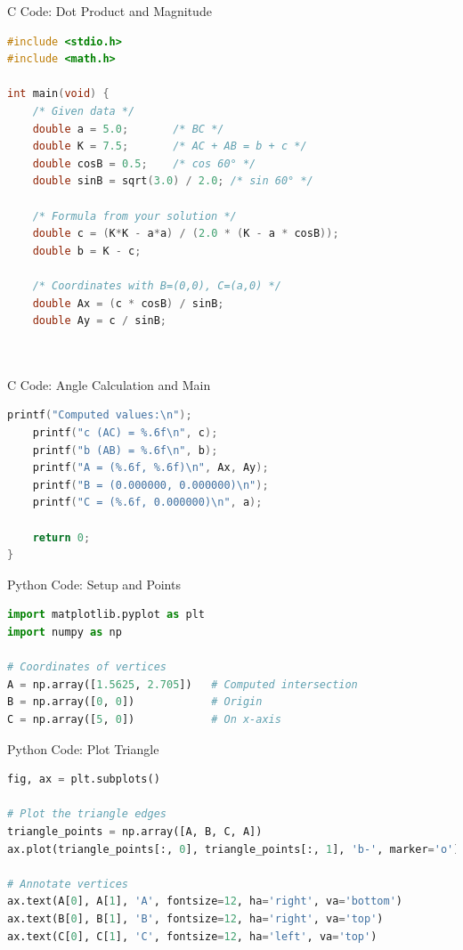 \documentclass{beamer}
\begin{document}
\begin{frame}[fragile]{C Code: Dot Product and Magnitude}
\begin{lstlisting}[language=C]
#include <stdio.h>
#include <math.h>

int main(void) {
    /* Given data */
    double a = 5.0;       /* BC */
    double K = 7.5;       /* AC + AB = b + c */
    double cosB = 0.5;    /* cos 60° */
    double sinB = sqrt(3.0) / 2.0; /* sin 60° */

    /* Formula from your solution */
    double c = (K*K - a*a) / (2.0 * (K - a * cosB));
    double b = K - c;

    /* Coordinates with B=(0,0), C=(a,0) */
    double Ax = (c * cosB) / sinB;
    double Ay = c / sinB;

    

\end{lstlisting}
\end{frame}

\begin{frame}[fragile]{C Code: Angle Calculation and Main}
\begin{lstlisting}[language=C]
printf("Computed values:\n");
    printf("c (AC) = %.6f\n", c);
    printf("b (AB) = %.6f\n", b);
    printf("A = (%.6f, %.6f)\n", Ax, Ay);
    printf("B = (0.000000, 0.000000)\n");
    printf("C = (%.6f, 0.000000)\n", a);

    return 0;
}
\end{lstlisting}
\end{frame}

 


\begin{frame}[fragile]{Python Code: Setup and Points}
\begin{lstlisting}[language=Python]
import matplotlib.pyplot as plt
import numpy as np

# Coordinates of vertices
A = np.array([1.5625, 2.705])   # Computed intersection
B = np.array([0, 0])            # Origin
C = np.array([5, 0])            # On x-axis
\end{lstlisting}
\end{frame}

\begin{frame}[fragile]{Python Code: Plot Triangle}
\begin{lstlisting}[language=Python]
fig, ax = plt.subplots()

# Plot the triangle edges
triangle_points = np.array([A, B, C, A])
ax.plot(triangle_points[:, 0], triangle_points[:, 1], 'b-', marker='o')

# Annotate vertices
ax.text(A[0], A[1], 'A', fontsize=12, ha='right', va='bottom')
ax.text(B[0], B[1], 'B', fontsize=12, ha='right', va='top')
ax.text(C[0], C[1], 'C', fontsize=12, ha='left', va='top')
\end{lstlisting}
\end{frame}
\end{document}
